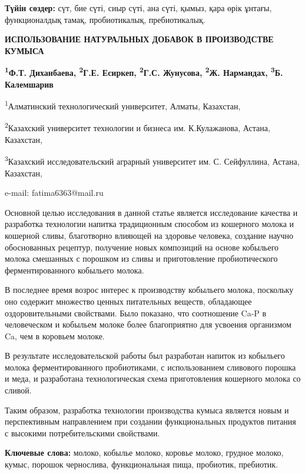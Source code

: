 {\bfseries Түйін сөздер:} сүт, бие сүті, сиыр сүті, ана сүті, қымыз, қара
өрік ұнтағы, функционалдық тамақ, пробиотикалық, пребиотикалық.

\begin{center}
{\large\bfseries ИСПОЛЬЗОВАНИЕ НАТУРАЛЬНЫХ ДОБАВОК В ПРОИЗВОДСТВЕ КУМЫСА}

{\bfseries \textsuperscript{1}Ф.Т. Диханбаева, \textsuperscript{2}Г.Е. Есиркеп, \textsuperscript{2}Г.С. Жунусова, \textsuperscript{2}Ж. Нармандах, \textsuperscript{3}Б. Калемшарив}

\textsuperscript{1}Алматинский технологический университет, Алматы,
Казахстан,

\textsuperscript{2}Казахский университет технологии и бизнеса им.
К.Кулажанова, Астана, Казахстан,

\textsuperscript{3}Казахский исследовательский аграрный университет им.
С. Сейфуллина, Астана, Казахстан,

e-mail: fatima6363@mail.ru
\end{center}

Основной целью исследования в данной статье является исследование
качества и разработка технологии напитка традиционным способом из
кошерного молока и кошерной сливы, благотворно влияющей на здоровье
человека, создание научно обоснованных рецептур, получение новых
композиций на основе кобыльего молока смешанных с порошком из сливы и
приготовление пробиотического ферментированного кобыльего молока.

В последнее время возрос интерес к производству кобыльего молока,
поскольку оно содержит множество ценных питательных веществ, обладающее
оздоровительными свойствами. Было показано, что соотношение Ca-P в
человеческом и кобыльем молоке более благоприятно для усвоения
организмом Ca, чем в коровьем молоке.

В результате исследовательской работы был разработан напиток из
кобыльего молока ферментированного пробиотиками, с использованием
сливового порошка и меда, и разработана технологическая схема
приготовления кошерного молока со сливой.

Таким образом, разработка технологии производства кумыса является новым
и перспективным направлением при создании функциональных продуктов
питания с высокими потребительскими свойствами.

{\bfseries Ключевые слова:} молоко, кобылье молоко, коровье молоко, грудное
молоко, кумыс, порошок чернослива, функциональная пища, пробиотик,
пребиотик.

